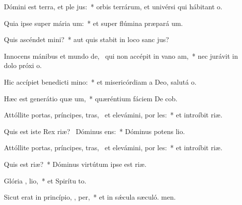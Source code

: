 \item Dómini est terra, et ple jus:~* orbis terrárum, et univérsi qui hábitant  o.
\item Quia ipse super mária  um:~* et super flúmina præpará um.
\item Quis ascéndet   mini?~* aut quis stabit in loco sanc jus?
\item Innocens mánibus et mundo de,~\pscross{} qui non accépit in vano  am,~* nec jurávit in dolo próxi o.
\item Hic accípiet benedicti  mino:~* et misericórdiam a Deo, salutá o.
\item Hæc est generátio quæ um,~* quæréntium fáciem De cob.
\item Attóllite portas, príncipes, tras,~\pscross{} et elevámini, por les:~* et introíbit  riæ.
\item Quis est iste Rex riæ?~\pscross{} Dóminus   ens:~* Dóminus potens  lio.
\item Attóllite portas, príncipes, tras,~\pscross{} et elevámini, por les:~* et introíbit  riæ.
\item Quis est   riæ?~* Dóminus virtútum ipse est  riæ.
\item Glória ,  lio,~* et Spirítu to.
\item Sicut erat in princípio,  ,  per,~* et in sǽcula sæculó. men.
